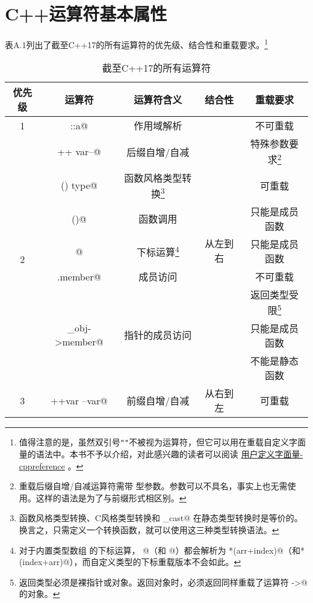 \chapter{C++运算符基本属性}\label{ch:appendix_A}
表A.1列出了截至C++17的所有运算符的优先级、结合性和重载要求。\footnote{值得注意的是，虽然双引号\texttt{""}不被视为运算符，但它可以用在重载自定义字面量的语法中。本书不予以介绍，对此感兴趣的读者可以阅读 \href{https://zh.cppreference.com/w/cpp/language/user_literal}{用户定义字面量-cppreference} 。}\par%
\begin{longtable}{|c|c|c|c|c|}
\caption{截至C++17的所有运算符}\label{tab:A-1}\\
\hline
\textbf{优先级} & \textbf{运算符} & \textbf{运算符含义} & \textbf{结合性} & \textbf{重载要求}\\
\hline\hline
1 & \lstinline@scope::a@ & 作用域解析 & \multirow{9}{*}{从左到右} & 不可重载\\
\cline{1-3}\cline{5-5}
\multirow{8}{*}{2} & \lstinline@var++ var--@ & 后缀自增/自减 &  & 特殊参数要求\footnote{重载后缀自增/自减运算符需带 \lstinline@int@ 型参数。参数可以不具名，事实上也无需使用。这样的语法是为了与前缀形式相区别。}\\
\cline{2-3}\cline{5-5}
& \lstinline@type() type{}@ & 函数风格类型转换\footnote{函数风格类型转换、C风格类型转换和 \lstinline@static_cast@ 在静态类型转换时是等价的。换言之，只需定义一个转换函数，就可以使用这三种类型转换语法。} &  & 可重载\\
\cline{2-3}\cline{5-5}
& \lstinline@fun()@ & 函数调用 &  & 只能是成员函数\\
\cline{2-3}\cline{5-5}
& \lstinline@arr[index]@ & 下标运算\footnote{对于内置类型数组 \lstinline@arr@ 的下标运算， \lstinline@arr[index]@（和 \lstinline@index[arr]@）都会解析为 \lstinline@*(arr+index)@（和\lstinline@*(index+arr)@），而自定义类型的下标重载版本不会如此。} &  & 只能是成员函数\\
\cline{2-3}\cline{5-5}
& \lstinline@obj.member@ & 成员访问 &  & 不可重载\\
\cline{2-3}\cline{5-5}
& \multirow{3}{*}{\lstinline@p_obj->member@} & \multirow{3}{*}{指针的成员访问} &  & 返回类型受限\footnote{返回类型必须是裸指针或对象。返回对象时，必须返回同样重载了运算符 \lstinline@->@ 的对象。}\\
&  &  &  & 只能是成员函数\\
&  &  &  & 不能是静态函数\\
\hline
\multirow{9}{*}{3} & \lstinline@++var --var@ & 前缀自增/自减 & \multirow{9}{*}{从右到左} & 可重载\\

\end{longtable}
